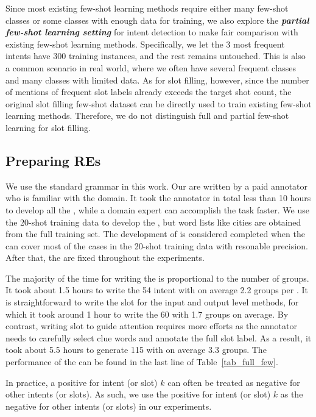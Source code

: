Since most existing few-shot learning methods require either many few-shot classes or some classes with enough data for training, we also explore the
\textbf{\emph{partial few-shot learning setting}} for intent detection to make fair comparison with existing few-shot learning methods.
Specifically, we let the 3 most frequent intents have 300 training instances, and the rest remains untouched.
This is also a common scenario in real world, where we often have several frequent classes and many classes with limited data.
As for slot filling, however, since the number of mentions of frequent slot labels already exceeds the target shot count,
the original slot filling few-shot dataset can be directly used to train existing few-shot learning methods.
Therefore, we do not distinguish full and partial few-shot learning for slot filling.

\subsection{Preparing REs}
\label{re_in_exp} We use the standard \RE grammar in this work. Our \REs are written by a paid annotator 
who is familiar with the domain.
It took the annotator in total less than 10 hours
to develop all the \REs, while a domain expert can accomplish the task faster. 
We use the 20-shot training data to develop the \REs, but word lists
like cities are obtained from the full training set. 
The development of \REs is considered completed when the \REs can cover most of the cases in the 20-shot training data with resonable precision.
After that, the \REs are fixed throughout the experiments.

The majority of the time 
for %
writing the \REs is proportional to the number of \RE groups. 
It took about 1.5 hours to write the 54 intent \REs with on average 2.2 groups per \RE. It is straightforward
to write the slot \REs for the input and output level methods, for which it took around
 1 hour to write the 60 \REs with 1.7 groups on average. By contrast, writing slot \REs to guide attention requires more
efforts as the annotator needs to carefully select clue words and annotate the full slot label. As a result, it took about 
5.5 hours to generate 115 \REs with on average 3.3 groups.
The performance of the \REs can be found in the last line of Table~\ref{tab_full_few}.

In practice, a positive \RE for intent (or slot) $k$ can often be treated as negative \REs for other intents (or slots). As such, we use the positive \REs for intent (or slot) $k$ as the negative \REs for other intents (or slots) in our experiments.


